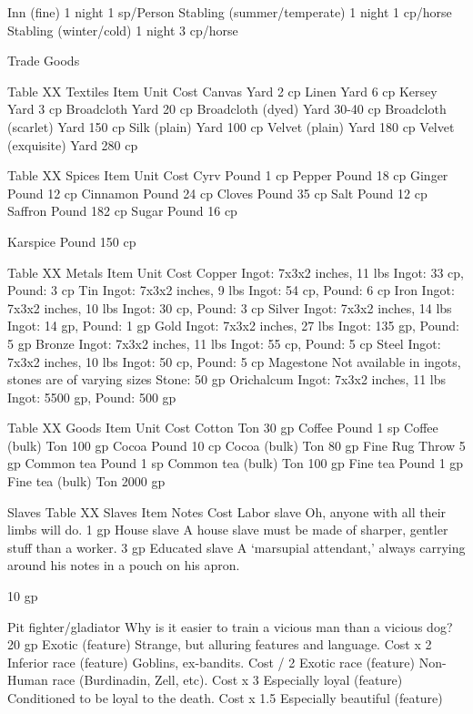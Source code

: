 \documentclass[oneside,11pt,english]{book}
\begin{document}
Inn (fine) 1 night 1 sp/Person 
Stabling (summer/temperate) 1 night 1 cp/horse 
Stabling (winter/cold) 1 night 3 cp/horse 

 

Trade Goods 

 
Table XX Textiles 
Item Unit Cost 
Canvas Yard 2 cp 
Linen Yard 6 cp 
Kersey Yard 3 cp 
Broadcloth Yard 20 cp 
Broadcloth (dyed) Yard 30-40 cp 
Broadcloth (scarlet) Yard 150 cp 
Silk (plain) Yard 100 cp 
Velvet (plain) Yard 180 cp 
Velvet (exquisite) Yard 280 cp 

 
Table XX Spices 
Item Unit Cost 
Cyrv Pound 1 cp 
Pepper Pound 18 cp 
Ginger Pound 12 cp 
Cinnamon Pound 24 cp 
Cloves Pound 35 cp 
Salt Pound 12 cp 
Saffron Pound 182 cp 
Sugar Pound 16 cp 


Karspice Pound 150 cp 

 
Table XX Metals 
Item Unit Cost 
Copper Ingot: 7x3x2 inches, 11 lbs Ingot: 33 cp, Pound: 3 cp 
Tin Ingot: 7x3x2 inches, 9 lbs Ingot: 54 cp, Pound: 6 cp 
Iron Ingot: 7x3x2 inches, 10 lbs Ingot: 30 cp, Pound: 3 cp 
Silver Ingot: 7x3x2 inches, 14 lbs Ingot: 14 gp, Pound: 1 gp 
Gold Ingot: 7x3x2 inches, 27 lbs Ingot: 135 gp, Pound: 5 gp 
Bronze Ingot: 7x3x2 inches, 11 lbs Ingot: 55 cp, Pound: 5 cp 
Steel Ingot: 7x3x2 inches, 10 lbs Ingot: 50 cp, Pound: 5 cp 
Magestone Not available in ingots, stones are of varying sizes Stone: 50 gp 
Orichalcum Ingot: 7x3x2 inches, 11 lbs Ingot: 5500 gp, Pound: 500 gp 

 
Table XX Goods 
Item Unit Cost 
Cotton Ton 30 gp 
Coffee Pound 1 sp 
Coffee (bulk) Ton 100 gp 
Cocoa Pound 10 cp 
Cocoa (bulk) Ton 80 gp 
Fine Rug Throw 5 gp 
Common tea Pound 1 sp 
Common tea (bulk) Ton 100 gp 
Fine tea Pound 1 gp 
Fine tea (bulk) Ton 2000 gp 

 


Slaves 
Table XX Slaves 
Item Notes Cost 
Labor slave Oh, anyone with all their limbs will do. 1 gp 
House slave A house slave must be made of sharper, gentler stuff than a worker. 3 gp 
Educated slave A ‘marsupial attendant,’ always carrying around his notes in a pouch on 
his apron. 

10 gp 

Pit fighter/gladiator Why is it easier to train a vicious man than a vicious dog? 20 gp 
Exotic (feature) Strange, but alluring features and language. Cost x 2 
Inferior race (feature) Goblins, ex-bandits. Cost / 2 
Exotic race (feature) Non-Human race (Burdinadin, Zell, etc). Cost x 3 
Especially loyal (feature) Conditioned to be loyal to the death. Cost x 
1.5 
Especially beautiful 
(feature) 
\end{document}
